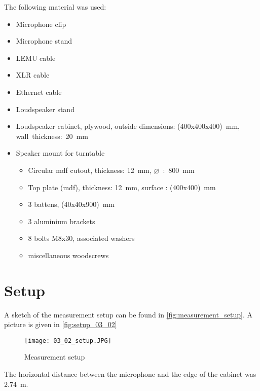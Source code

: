 The following material was used:
\begin{itemize}[noitemsep]
\item Microphone clip
\item Microphone stand
\item LEMU cable
\item XLR cable
\item Ethernet cable
\item Loudspeaker stand
\item Loudspeaker cabinet, plywood, outside dimensions: (400x400x400)\SI{}{\milli\meter}, wall~thickness:~\SI{20}{\milli\meter}
\item Speaker mount for turntable
\begin{itemize}[noitemsep]
\item Circular \gls{mdf} cutout, thickness: \SI{12}{\milli\meter}, {\(\varnothing\)~:~\SI{800}{\milli\meter}}
\item Top plate (\gls{mdf}), thickness: \SI{12}{\milli\meter}, surface : (400x400)\SI{}{\milli\meter}
\item 3 battens, (40x40x900)\SI{}{\milli\meter}
\item 3 aluminium brackets
\item 8 bolts M8x30, associated washers
\item miscellaneous woodscrews

\end{itemize}
\end{itemize}

\section*{Setup}
A sketch of the measurement setup can be found in \autoref{fig:measurement_setup}. A picture is given in \autoref{fig:setup_03_02}

\begin{figure}[htbp]
	\centering
	\texttt{[image: 03\_02\_setup.JPG]}
	\caption{Measurement setup}
		\label{fig:setup_03_02}
\end{figure}

The horizontal distance between the microphone and the edge of the cabinet was \SI{2.74}{\meter}.